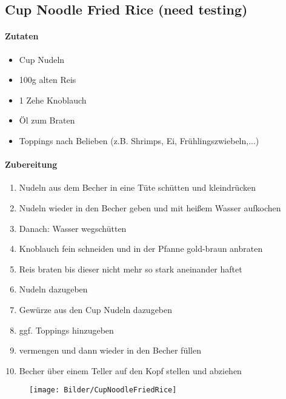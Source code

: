 
\newpage
\subsection{Cup Noodle Fried Rice (need testing)}
\paragraph{Zutaten}
\begin{itemize}[noitemsep]
	\item Cup Nudeln	
	\item 100g alten Reis
	\item 1 Zehe Knoblauch
	\item Öl zum Braten
	\item Toppings nach Belieben (z.B. Shrimps, Ei, Frühlingszwiebeln,...)
\end{itemize}
\paragraph{Zubereitung}
\begin{enumerate}[noitemsep]
	\item Nudeln aus dem Becher in eine Tüte schütten und kleindrücken
	\item Nudeln wieder in den Becher geben und mit heißem Wasser aufkochen 
	\item Danach: Wasser wegschütten
	\item Knoblauch fein schneiden und in der Pfanne gold-braun anbraten 
	\item Reis braten bis dieser nicht mehr so stark aneinander haftet
	\item Nudeln dazugeben
	\item Gewürze aus den Cup Nudeln dazugeben 
	\item ggf. Toppings hinzugeben 
	\item vermengen und dann wieder in den Becher füllen
	\item Becher über einem Teller auf den Kopf stellen und abziehen
\end{enumerate}
\vspace{1cm}
\begin{figure}[h]
\centering
\texttt{[image: Bilder/CupNoodleFriedRice]}
\end{figure}